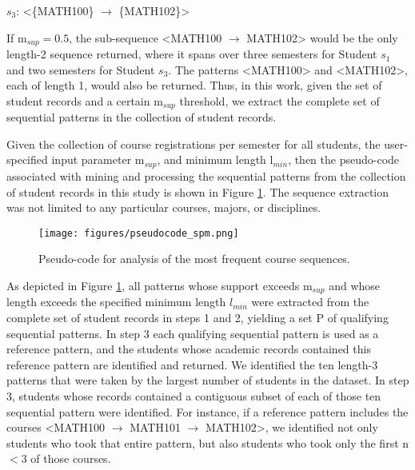 \documentclass[conference]{IEEEtran}
\begin{document}
$s_3$: \textless\{MATH100\} $\rightarrow$ \{MATH102\}\textgreater

If m$_{sup}=0.5$, the sub-sequence \textless MATH100  $\rightarrow$ MATH102\textgreater{} would be the only length-2 sequence returned, where it spans over three semesters for Student $s_1$ and two semesters for Student $s_3$.  The patterns \textless MATH100\textgreater{} and \textless MATH102\textgreater{}, each of length 1, would also be returned.  Thus, in this work, given the set of student records and a certain m$_{sup}$ threshold, we extract the complete set of sequential patterns in the collection of student records.  

Given the collection of course registrations per semester for all students, the user-specified input parameter m$_{sup}$, and minimum length l$_{min}$, then the pseudo-code associated with mining and processing the sequential patterns from the collection of student records in this study is shown in Figure \ref{pseudocode}.  The sequence extraction was not limited to any particular courses, majors, or disciplines.
\begin{figure}[htbp]
\texttt{[image: figures/pseudocode\_spm.png]}
\caption{Pseudo-code for analysis of the most frequent course sequences.}
\label{pseudocode}
\end{figure}

As depicted in Figure \ref{pseudocode}, all patterns whose support exceeds m$_{sup}$ and whose length exceeds the specified minimum length $l_{min}$ were extracted from the complete set of student records in steps 1 and 2, yielding a set P of qualifying sequential patterns.  In step 3 each qualifying sequential pattern is used as a reference pattern, and the students whose academic records contained this reference pattern are identified and returned.  We identified the ten length-3 patterns that were taken by the largest number of students in the dataset.  In step 3, students whose records contained a contiguous subset of each of those ten sequential pattern were identified.  For instance, if a reference pattern includes the courses \textless MATH100 $\rightarrow$ MATH101 $\rightarrow$ MATH102\textgreater{}, we identified not only students who took that entire pattern, but also students who took only the first n$<$3 of those courses.  %
\end{document}
